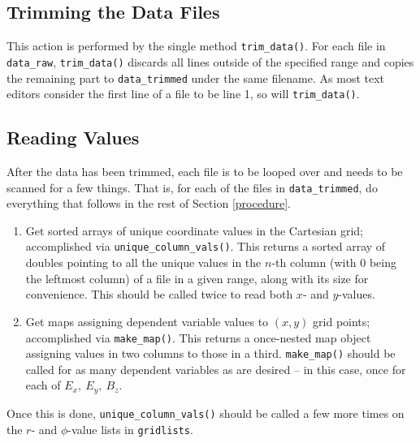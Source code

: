 \documentclass[hidelinks,12pt]{article}
\begin{document}
\subsection{Trimming the Data Files}
This action is performed by the single method \texttt{trim\_data()}. For each file in \texttt{data\_raw}, \texttt{trim\_data()} discards all lines outside of the specified range and copies the remaining part to \texttt{data\_trimmed} under the same filename. As most text editors consider the first line of a file to be line 1, so will \texttt{trim\_data()}.

\subsection{Reading Values}
After the data has been trimmed, each file is to be looped over and needs to be scanned for a few things. That is, for each of the files in \texttt{data\_trimmed}, do everything that follows in the rest of Section \ref{procedure}. 
\begin{enumerate}[label={\arabic{enumi}.},leftmargin={1cm},rightmargin={1cm}]
    \item Get sorted arrays of unique coordinate values in the Cartesian grid; accomplished via \texttt{unique\_column\_vals()}. This returns a sorted array of doubles pointing to all the unique values in the $n$-th column (with 0 being the leftmost column) of a file in a given range, along with its size for convenience. This should be called twice to read both $x$- and $y$-values.

    \item Get maps assigning dependent variable values to $(x,y)$ grid points; accomplished via \texttt{make\_map()}. This returns a once-nested map object assigning values in two columns to those in a third. \texttt{make\_map()} should be called for as many dependent variables as are desired -- in this case, once for each of $E_{x},~E_{y},~B_{z}$.
\end{enumerate}
Once this is done, \texttt{unique\_column\_vals()} should be called a few more times on the $r$- and $\phi$-value lists in \texttt{gridlists}.
\end{document}
